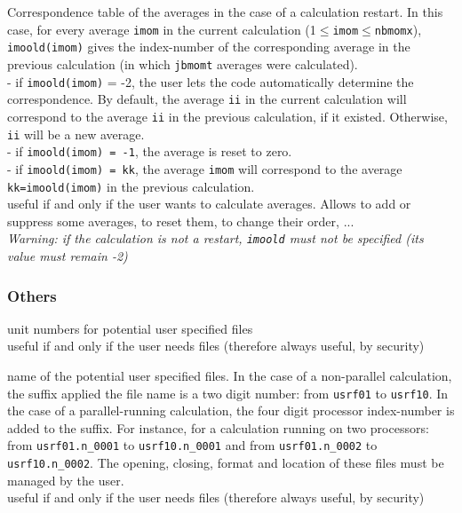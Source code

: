 {Correspondence table of the averages in the case of a calculation
restart. In this case, for every average {\tt imom} in the current
calculation (1$\leqslant${\tt imom}$\leqslant${\tt nbmomx}), {\tt imoold(imom)}
gives the index-number of the corresponding average in the previous calculation
(in which {\tt jbmomt} averages were calculated). \\
\hspace*{1.3cm} - if {\tt imoold(imom)} = -2, the user lets the code automatically
            determine the correspondence. By default, the average {\tt ii} in the
                current calculation will correspond to the average {\tt ii} in
                the previous calculation, if it existed.
                Otherwise, {\tt ii} will be a new average.\\
\hspace*{1.3cm} - if {\tt imoold(imom) = -1}, the average is reset to zero.\\
\hspace*{1.3cm} - if {\tt imoold(imom) = kk}, the average {\tt imom} will correspond
to the average {\tt kk=imoold(imom)} in the previous calculation.\\
useful if and only if the user wants to calculate averages.
Allows to add or suppress some averages, to reset them, to change their
order, ...\\
{\em Warning: if the calculation is not a restart, {\tt imoold} must not be
specified (its value must remain -2)}}

\subsubsection{Others}

{unit numbers for potential user specified files\\
useful if and only if the user needs files (therefore always useful, by security)}

{name of the potential user specified files. In the case of a non-parallel
calculation, the suffix applied the file name is a two digit number:
from \texttt{usrf01} to \texttt{usrf10}. In the case of a
parallel-running calculation, the four digit processor index-number is
added to the suffix. For instance, for a calculation running on two
processors: from \texttt{usrf01.n\_0001} to \texttt{usrf10.n\_0001} and
from \texttt{usrf01.n\_0002} to \texttt{usrf10.n\_0002}. The opening,
closing, format and location of these files must be managed by the user.\\
useful if and only if the user needs files (therefore always useful, by security)}

